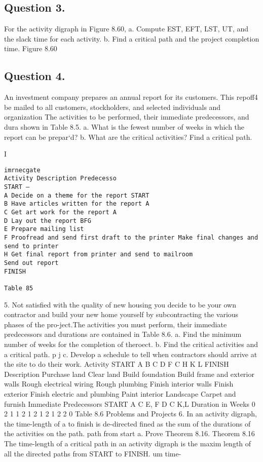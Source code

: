 \documentclass{article}
\begin{document}

\subsection{Question 3.} For the activity digraph in Figure 8.60, a. Compute EST, EFT, LST, UT, and the slack time for each activity. b. Find a critical path and the project completion time. 
Figure 8.60 

\subsection{Question 4.}  An investment company prepares an annual report for its customers. This repoff4 be mailed to all customers, stockholders, and selected individuals and organization The activities to be performed, their immediate predecessors, and dura shown in Table 8.5. a. What is the fewest number of weeks in which the report can be prepar‘d? b. What are the critical activities? Find a critical path. 

I 
\begin{verbatim}
imrnecgate 
Activity Description Predecesso 
START — 
A Decide on a theme for the report START 
B Have articles written for the report A 
C Get art work for the report A 
D Lay out the report BFG 
E Prepare mailing list 
F Proofread and send first draft to the printer Make final changes and send to printer 
H Get final report from printer and send to mailroom 
Send out report 
FINISH 

Table 85 
\end{verbatim}


5. Not satisfied with the quality of new housing you decide to be your own contractor and build your new home yourself by subcontracting the various phases of the pro-ject.The activities you must perform, their immediate predecessors and durations are contained in Table 8.6. a. Find the minimum number of weeks for the completion of theroect. b. Find the critical activities and a critical path. p j c. Develop a schedule to tell when contractors should arrive at the site to do their work. 
Activity START A B C D F C H K L FINISH Description Purchase land Clear land Build foundation Build frame and exterior walls Rough electrical wiring Rough plumbing Finish interior walls Finish exterior Finish electric and plumbing Paint interior Landscape Carpet and furnish Immediate Predecessors START A C E, F D C K,L Duration in Weeks 0 2 1 1 2 1 2 1 2 1 2 2 0 
Table 8.6 
Problems and Projects 6. In an activity digraph, the time-length of a to finish is de-directed fined as the sum of the durations of the activities on the path. path from start a. Prove Theorem 8.16. 
Theorem 8.16 The time-length of a critical path in an activity digraph is the maxim length of all the directed paths from START to FINISH. um time- 
\end{document}
